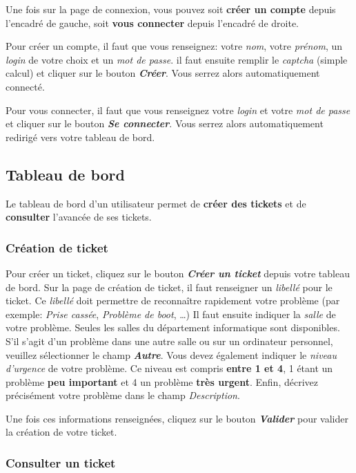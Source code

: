 \documentclass[12pt, a4paper]{article}
\begin{document}
\noindent Une fois sur la page de connexion, vous pouvez soit \textbf{créer un compte} depuis l'encadré de gauche,
soit \textbf{vous connecter} depuis l'encadré de droite.

Pour créer un compte, il faut que vous renseignez: votre \textit{nom}, votre \textit{prénom}, un \textit{login} de votre choix et un \textit{mot de passe}. 
il faut ensuite remplir le \textit{captcha} (simple calcul) et cliquer sur le bouton \textit{\textbf{Créer}}.
Vous serrez alors automatiquement connecté.

\bigskip
Pour vous connecter, il faut que vous renseignez votre \textit{login} et votre \textit{mot de passe} et cliquer sur le bouton \textit{\textbf{Se connecter}}.
Vous serrez alors automatiquement redirigé vers votre tableau de bord.

\subsection*{Tableau de bord}

Le tableau de bord d'un utilisateur permet de \textbf{créer des tickets} et de \textbf{consulter} l'avancée de ses tickets.

\subsubsection*{Création de ticket}

Pour créer un ticket, cliquez sur le bouton \textit{\textbf{Créer un ticket}} depuis votre tableau de bord.
Sur la page de création de ticket, il faut renseigner un \textit{libellé} pour le ticket.
Ce \textit{libellé} doit permettre de reconnaître rapidement votre problème (par exemple: \textit{Prise cassée}, \textit{Problème de boot}, \ldots)
Il faut ensuite indiquer la \textit{salle} de votre problème.
Seules les salles du département informatique sont disponibles.
S'il s'agit d'un problème dans une autre salle ou sur un ordinateur personnel, veuillez sélectionner le champ \textit{\textbf{Autre}}.
Vous devez également indiquer le \textit{niveau d'urgence} de votre problème.
Ce niveau est compris \textbf{entre 1 et 4}, 1 étant un problème \textbf{peu important} et 4 un problème \textbf{très urgent}.
Enfin, décrivez précisément votre problème dans le champ \textit{Description}.

\bigskip
\noindent Une fois ces informations renseignées, cliquez sur le bouton \textit{\textbf{Valider}} pour valider la création de votre ticket.

\subsubsection*{Consulter un ticket}
\end{document}
